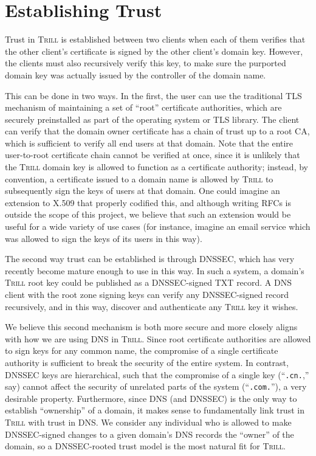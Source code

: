 \documentclass[12pt]{article}
\newcommand{\Trill}{\textsc{Trill}\xspace}
\begin{document}
\section*{Establishing Trust}
Trust in \Trill is established between two clients when each of them verifies
that the other client's certificate is signed by the other client's domain key.
However, the clients must also recursively verify this key, to make sure the
purported domain key was actually issued by the controller of the domain name.

This can be done in two ways. In the first, the user can use the traditional TLS
mechanism of maintaining a set of ``root'' certificate authorities, which are
securely preinstalled as part of the operating system or TLS library. The client
can verify that the domain owner certificate has a chain of trust up to a root
CA, which is sufficient to verify all end users at that domain. Note that the
entire user-to-root certificate chain cannot be verified at once, since it is
unlikely that the \Trill domain key is allowed to function as a certificate
authority; instead, by convention, a certificate issued to a domain name is
allowed by \Trill to subsequently sign the keys of users at that domain. One
could imagine an extension to X.509 that properly codified this, and although
writing RFCs is outside the scope of this project, we believe that such an
extension would be useful for a wide variety of use cases (for instance, imagine
an email service which was allowed to sign the keys of its users in this way).

The second way trust can be established is through DNSSEC, which has very
recently become mature enough to use in this way. In such a system, a domain's
\Trill root key could be published as a DNSSEC-signed TXT record. A DNS client
with the root zone signing keys can verify any DNSSEC-signed record recursively,
and in this way, discover and authenticate any \Trill key it wishes.

We believe this second mechanism is both more secure and more closely aligns
with how we are using DNS in \Trill. Since root certificate authorities are
allowed to sign keys for any common name, the compromise of a single certificate
authority is sufficient to break the security of the entire system. In contrast,
DNSSEC keys are hierarchical, such that the compromise of a single key
(``\verb`.cn.`,'' say) cannot affect the security of unrelated parts of the system
(``\verb`.com.`''), a very desirable property. Furthermore, since DNS (and
DNSSEC) is the only way to establish ``ownership'' of a domain, it makes sense
to fundamentally link trust in \Trill with trust in DNS. We consider any
individual who is allowed to make DNSSEC-signed changes to a given domain's DNS
records the ``owner'' of the domain, so a DNSSEC-rooted trust model is the most
natural fit for \Trill.
\end{document}
